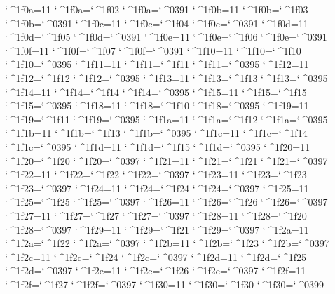 \catcode`^^^^1f0a=11 \lccode`^^^^1f0a=`^^^^1f02 \uccode`^^^^1f0a=`^^^^0391 
\catcode`^^^^1f0b=11 \lccode`^^^^1f0b=`^^^^1f03 \uccode`^^^^1f0b=`^^^^0391 
\catcode`^^^^1f0c=11 \lccode`^^^^1f0c=`^^^^1f04 \uccode`^^^^1f0c=`^^^^0391 
\catcode`^^^^1f0d=11 \lccode`^^^^1f0d=`^^^^1f05 \uccode`^^^^1f0d=`^^^^0391 
\catcode`^^^^1f0e=11 \lccode`^^^^1f0e=`^^^^1f06 \uccode`^^^^1f0e=`^^^^0391 
\catcode`^^^^1f0f=11 \lccode`^^^^1f0f=`^^^^1f07 \uccode`^^^^1f0f=`^^^^0391 
\catcode`^^^^1f10=11 \lccode`^^^^1f10=`^^^^1f10 \uccode`^^^^1f10=`^^^^0395 
\catcode`^^^^1f11=11 \lccode`^^^^1f11=`^^^^1f11 \uccode`^^^^1f11=`^^^^0395 
\catcode`^^^^1f12=11 \lccode`^^^^1f12=`^^^^1f12 \uccode`^^^^1f12=`^^^^0395 
\catcode`^^^^1f13=11 \lccode`^^^^1f13=`^^^^1f13 \uccode`^^^^1f13=`^^^^0395 
\catcode`^^^^1f14=11 \lccode`^^^^1f14=`^^^^1f14 \uccode`^^^^1f14=`^^^^0395 
\catcode`^^^^1f15=11 \lccode`^^^^1f15=`^^^^1f15 \uccode`^^^^1f15=`^^^^0395 
\catcode`^^^^1f18=11 \lccode`^^^^1f18=`^^^^1f10 \uccode`^^^^1f18=`^^^^0395 
\catcode`^^^^1f19=11 \lccode`^^^^1f19=`^^^^1f11 \uccode`^^^^1f19=`^^^^0395 
\catcode`^^^^1f1a=11 \lccode`^^^^1f1a=`^^^^1f12 \uccode`^^^^1f1a=`^^^^0395 
\catcode`^^^^1f1b=11 \lccode`^^^^1f1b=`^^^^1f13 \uccode`^^^^1f1b=`^^^^0395 
\catcode`^^^^1f1c=11 \lccode`^^^^1f1c=`^^^^1f14 \uccode`^^^^1f1c=`^^^^0395 
\catcode`^^^^1f1d=11 \lccode`^^^^1f1d=`^^^^1f15 \uccode`^^^^1f1d=`^^^^0395 
\catcode`^^^^1f20=11 \lccode`^^^^1f20=`^^^^1f20 \uccode`^^^^1f20=`^^^^0397 
\catcode`^^^^1f21=11 \lccode`^^^^1f21=`^^^^1f21 \uccode`^^^^1f21=`^^^^0397 
\catcode`^^^^1f22=11 \lccode`^^^^1f22=`^^^^1f22 \uccode`^^^^1f22=`^^^^0397 
\catcode`^^^^1f23=11 \lccode`^^^^1f23=`^^^^1f23 \uccode`^^^^1f23=`^^^^0397 
\catcode`^^^^1f24=11 \lccode`^^^^1f24=`^^^^1f24 \uccode`^^^^1f24=`^^^^0397 
\catcode`^^^^1f25=11 \lccode`^^^^1f25=`^^^^1f25 \uccode`^^^^1f25=`^^^^0397 
\catcode`^^^^1f26=11 \lccode`^^^^1f26=`^^^^1f26 \uccode`^^^^1f26=`^^^^0397 
\catcode`^^^^1f27=11 \lccode`^^^^1f27=`^^^^1f27 \uccode`^^^^1f27=`^^^^0397 
\catcode`^^^^1f28=11 \lccode`^^^^1f28=`^^^^1f20 \uccode`^^^^1f28=`^^^^0397 
\catcode`^^^^1f29=11 \lccode`^^^^1f29=`^^^^1f21 \uccode`^^^^1f29=`^^^^0397 
\catcode`^^^^1f2a=11 \lccode`^^^^1f2a=`^^^^1f22 \uccode`^^^^1f2a=`^^^^0397 
\catcode`^^^^1f2b=11 \lccode`^^^^1f2b=`^^^^1f23 \uccode`^^^^1f2b=`^^^^0397 
\catcode`^^^^1f2c=11 \lccode`^^^^1f2c=`^^^^1f24 \uccode`^^^^1f2c=`^^^^0397 
\catcode`^^^^1f2d=11 \lccode`^^^^1f2d=`^^^^1f25 \uccode`^^^^1f2d=`^^^^0397 
\catcode`^^^^1f2e=11 \lccode`^^^^1f2e=`^^^^1f26 \uccode`^^^^1f2e=`^^^^0397 
\catcode`^^^^1f2f=11 \lccode`^^^^1f2f=`^^^^1f27 \uccode`^^^^1f2f=`^^^^0397 
\catcode`^^^^1f30=11 \lccode`^^^^1f30=`^^^^1f30 \uccode`^^^^1f30=`^^^^0399 
